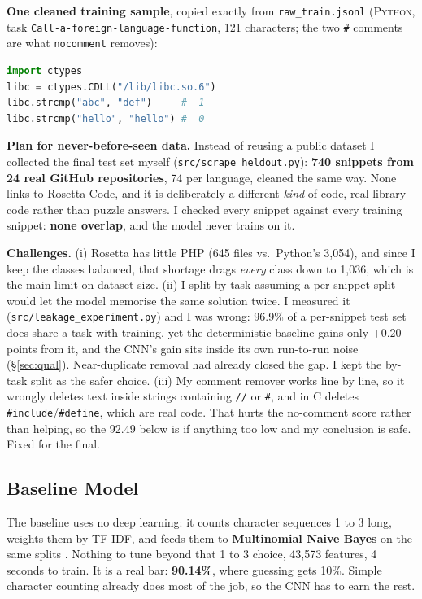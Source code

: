\documentclass{article}
\begin{document}
\textbf{One cleaned training sample}, copied exactly from \texttt{raw\_train.jsonl}
(\textsc{Python}, task \texttt{Call-a-foreign-language-function}, 121 characters; the two
\texttt{\#} comments are what \texttt{nocomment} removes):
\begin{lstlisting}[language=Python]
import ctypes
libc = ctypes.CDLL("/lib/libc.so.6")
libc.strcmp("abc", "def")     # -1
libc.strcmp("hello", "hello") #  0
\end{lstlisting}

\textbf{Plan for never-before-seen data.} Instead of reusing a public dataset I collected the final
test set myself (\texttt{src/scrape\_heldout.py}): \textbf{740 snippets from 24 real GitHub
repositories}, 74 per language, cleaned the same way. None links to Rosetta Code, and it is
deliberately a different \emph{kind} of code, real library code rather than puzzle answers. I checked every
snippet against every training snippet: \textbf{none overlap}, and the model never trains on it.

\textbf{Challenges.} (i) Rosetta has little PHP (645 files vs.\ Python's 3{,}054), and since I keep
the classes balanced, that shortage drags \emph{every} class down to 1{,}036, which is the main
limit on dataset size. (ii) I split by task assuming a per-snippet split would let the model memorise the same solution
twice. I measured it (\texttt{src/leakage\_experiment.py}) and I was wrong: 96.9\% of a per-snippet
test set does share a task with training, yet the deterministic baseline gains only $+0.20$ points
from it, and the CNN's gain sits inside its own run-to-run noise (\S\ref{sec:qual}). Near-duplicate
removal had already closed the gap. I kept the by-task split as the safer choice. (iii) My comment remover works line by line, so it wrongly deletes text inside strings containing
\texttt{//} or \texttt{\#}, and in C deletes \texttt{\#include}/\texttt{\#define}, which are real
code. That hurts the no-comment score rather than helping, so the 92.49 below is if anything too low
and my conclusion is safe. Fixed for the final.

\vspace{-6pt}
\subsection{Baseline Model}
\vspace{-4pt}

The baseline uses no deep learning: it counts character sequences 1 to 3 long, weights them by
TF-IDF, and feeds them to \textbf{Multinomial Naive Bayes} on the same splits
\citep{khasnabish2014detecting,ugurel2002whats}. Nothing to tune beyond that 1 to 3 choice, 43{,}573 features, 4 seconds to train. It is a real bar: \textbf{90.14\%}, where guessing gets 10\%. Simple
character counting already does most of the job, so the CNN has to earn the rest.
\end{document}
